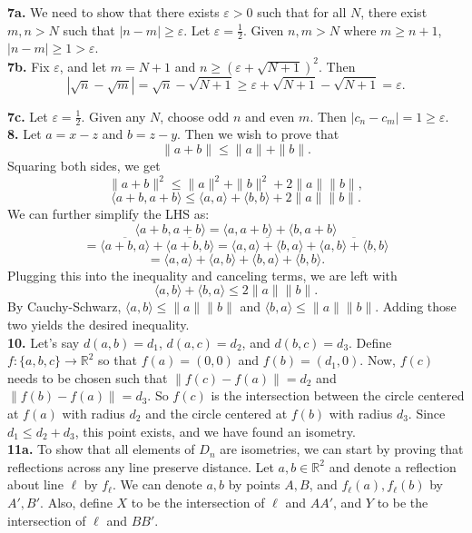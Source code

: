 \documentclass{article}
\newcommand{\R}{\mathbb{R}}
\newcommand{\eps}{\varepsilon}
\newcommand{\la}{\langle}
\newcommand{\ra}{\rangle}
\begin{document}
\textbf{7a.} We need to show that there exists $\eps > 0$ such that for all $N$, there exist $m, n > N$ such that $|n - m| \ge \eps$. Let $\eps = \frac{1}{2}$. Given $n, m > N$ where $m \ge n + 1$, $|n - m| \ge 1 > \eps$. \\

\textbf{7b.} Fix $\eps$, and let $m = N + 1$ and $n \ge (\eps + \sqrt{N + 1})^2$. Then
$$\left|\sqrt{n} - \sqrt{m}\right| = \sqrt{n} - \sqrt{N + 1} \ge \eps + \sqrt{N + 1} - \sqrt{N + 1} = \eps.$$

\textbf{7c.} Let $\eps = \frac{1}{2}$. Given any $N$, choose odd $n$ and even $m$. Then $|c_n - c_m| = 1 \ge \eps$. \\

\textbf{8.} Let $a = x - z$ and $b = z - y$. Then we wish to prove that
$$\|a + b\| \le \|a\| + \|b\|.$$
Squaring both sides, we get
$$\|a + b\|^2 \le \|a\|^2 + \|b\|^2 + 2\|a\|\|b\|,$$
$$\la a + b, a + b \ra \le \la a, a \ra + \la b, b \ra + 2\|a\|\|b\|.$$
We can further simplify the LHS as:
$$\la a + b, a + b \ra = \la a, a + b \ra + \la b, a + b \ra$$
$$= \overline{\la a + b, a \ra} + \overline{\la a + b, b \ra} = \overline{\la a, a \ra + \la b, a \ra} + \overline{\la a, b \ra + \la b, b \ra}$$
$$= \la a, a \ra + \la a, b \ra + \la b, a \ra + \la b, b \ra.$$
Plugging this into the inequality and canceling terms, we are left with
$$\la a, b \ra + \la b, a \ra \le 2\|a\|\|b\|.$$
By Cauchy-Schwarz, $\la a, b \ra \le \|a\|\|b\|$ and $\la b, a \ra \le \|a\|\|b\|$. Adding those two yields the desired inequality. \\

\textbf{10.} Let's say $d(a, b) = d_1$, $d(a, c) = d_2$, and $d(b, c) = d_3$. Define $f: \{a, b, c\} \to \R^2$ so that $f(a) = (0, 0)$ and $f(b) = (d_1, 0)$. Now, $f(c)$ needs to be chosen such that $\|f(c) - f(a)\| = d_2$ and $\|f(b) - f(a)\| = d_3$. So $f(c)$ is the intersection between the circle centered at $f(a)$ with radius $d_2$ and the circle centered at $f(b)$ with radius $d_3$. Since $d_1 \le d_2 + d_3$, this point exists, and we have found an isometry. \\

\textbf{11a.} To show that all elements of $D_n$ are isometries, we can start by proving that reflections across any line preserve distance. Let $a, b \in \R^2$ and denote a reflection about line $\ell$ by $f_\ell$. We can denote $a, b$ by points $A, B$, and $f_\ell(a), f_\ell(b)$ by $A', B'$. Also, define $X$ to be the intersection of $\ell$ and $AA'$, and $Y$ to be the intersection of $\ell$ and $BB'$. \\
\end{document}
